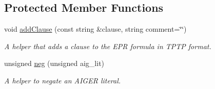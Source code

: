 \subsection*{Protected Member Functions}
\begin{DoxyCompactItemize}
\item 
void \hyperlink{classEPRSynthesizer_ab2815225b4bf61a52b8104b19aae6bcf}{add\-Clause} (const string \&clause, string comment=\char`\"{}\char`\"{})
\begin{DoxyCompactList}\small\item\em A helper that adds a clause to the E\-P\-R formula in T\-P\-T\-P format. \end{DoxyCompactList}\item 
unsigned \hyperlink{classEPRSynthesizer_afd429d29479abe7c3f78a232750a0e53}{neg} (unsigned aig\-\_\-lit)
\begin{DoxyCompactList}\small\item\em A helper to negate an A\-I\-G\-E\-R literal. \end{DoxyCompactList}\end{DoxyCompactItemize}
